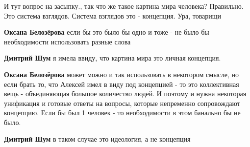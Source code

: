 \begin{itemize}
 

И тут вопрос на засыпку., так что же такое картина мира человека? Правильно.
Это система взглядов. Система взглядов это - концепция. Ура, товарищи\Smiley[1.0][yellow]

\begin{itemize}
 
\textbf{Оксана Белозёрова} если бы это было бы одно и тоже - не было бы необходимости использовать разные слова

 
\textbf{Дмитрий Шум} я имела ввиду, что картина мира это личная концепция.

 
\textbf{Оксана Белозёрова} может можно и так использовать в некотором смысле,
но если брать то, что Алексей имел в виду под концепцией - то это коллективная
вещь - объединяющая большое количество людей. И поэтому и нужна некоторая
унификация и готовые ответы на вопросы, которые непременно сопровождают
концепцию. Если бы был 1 человек - то необходимости в этом банально бы не было.

 
\textbf{Дмитрий Шум} в таком случае это идеология, а не концепция

 

\end{itemize}
\end{itemize}
